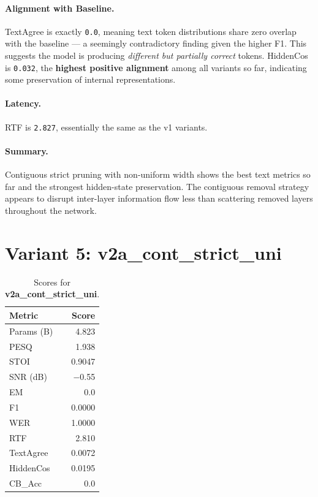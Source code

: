 \documentclass[11pt,a4paper]{article}
\newcommand{\scoreval}[1]{\texttt{#1}}
\begin{document}
\paragraph{Alignment with Baseline.}
TextAgree is exactly \scoreval{0.0}, meaning text token distributions share zero overlap with the baseline — a seemingly contradictory finding given the higher F1. This suggests the model is producing \emph{different but partially correct} tokens. HiddenCos is \scoreval{0.032}, the \textbf{highest positive alignment} among all variants so far, indicating some preservation of internal representations.

\paragraph{Latency.}
RTF is \scoreval{2.827}, essentially the same as the v1 variants.

\paragraph{Summary.}
Contiguous strict pruning with non-uniform width shows the best text metrics so far and the strongest hidden-state preservation. The contiguous removal strategy appears to disrupt inter-layer information flow less than scattering removed layers throughout the network.

\newpage
\section{Variant 5: v2a\_cont\_strict\_uni}

\begin{table}[H]
\centering
\caption{Scores for \textbf{v2a\_cont\_strict\_uni}.}
\begin{tabular}{l r}
\toprule
\textbf{Metric} & \textbf{Score} \\
\midrule
Params (B)    & 4.823 \\
PESQ          & 1.938 \\
STOI          & 0.9047 \\
SNR (dB)      & $-$0.55 \\
EM            & 0.0 \\
F1            & 0.0000 \\
WER           & 1.0000 \\
RTF           & 2.810 \\
TextAgree     & 0.0072 \\
HiddenCos     & 0.0195 \\
CB\_Acc       & 0.0 \\
\bottomrule
\end{tabular}
\end{table}
\end{document}
